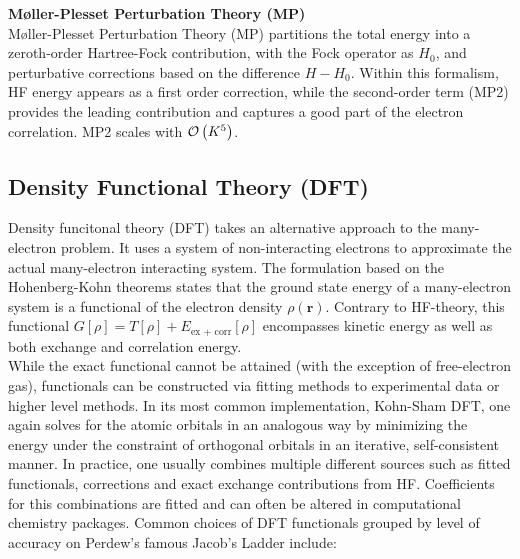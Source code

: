 \textbf{Møller-Plesset Perturbation Theory (MP)}\\
Møller-Plesset Perturbation Theory (MP) partitions the total energy into a zeroth-order Hartree-Fock contribution, with the Fock operator as $H_0$, and perturbative corrections based on the difference $H - H_0$. Within this formalism, HF energy appears as a first order correction, while the second-order term (MP2) provides the leading contribution and captures a good part of the electron correlation. MP2 scales with $\mathcal{O}\left(K^5\right)$. 

\subsection{Density Functional Theory (DFT)}
\label{subsec:background_dft}
Density funcitonal theory (DFT) takes an alternative approach to the many-electron problem. It uses a system of non-interacting electrons to approximate the actual many-electron interacting system. The formulation based on the Hohenberg-Kohn theorems \parencite{ref:hohenberg_kohn1964} states that the ground state energy of a many-electron system is a functional of the electron density $\rho(\mathbf{r})$. Contrary to HF-theory, this functional $G[\rho] = T[\rho] + E_{\text{ex + corr}}[\rho]$ encompasses kinetic energy as well as both exchange and correlation energy. \parencite{ref:kohn_sham_1965}\\
While the exact functional cannot be attained (with the exception of free-electron gas), functionals can be constructed via fitting methods to experimental data or higher level methods. 
In its most common implementation, Kohn-Sham DFT, one again solves for the atomic orbitals in an analogous way by minimizing the energy under the constraint of orthogonal orbitals in an iterative, self-consistent manner. In practice, one usually combines multiple different sources such as fitted functionals, corrections and exact exchange contributions from HF. Coefficients for this combinations are fitted and can often be altered in computational chemistry packages. 
Common choices of DFT functionals grouped by level of accuracy on Perdew's famous Jacob's Ladder \parencite{ref:perdew_jacobs_ladder} include:

